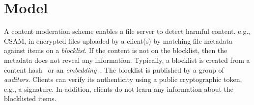 \section{Model}
\label{sec:model}
%



%

A content moderation scheme enables a file server to detect harmful content, e.g., 
CSAM, in encrypted files uploaded by a client(s) by matching file metadata against items on a \textit{blocklist}. If the content is not on the blocklist, then the 
metadata does not reveal any information. Typically, a blocklist 
is created from a content hash~\cite{bhowmick2021apple} or an 
\textit{embedding}~\cite{du2020perceptual, lu2017deep, raginsky2009locality}. The blocklist is published by a group of \emph{auditors}. Clients can verify its authenticity using a public cryptographic token, e.g., a signature. In addition, clients do not learn any information about the blocklisted items. 

